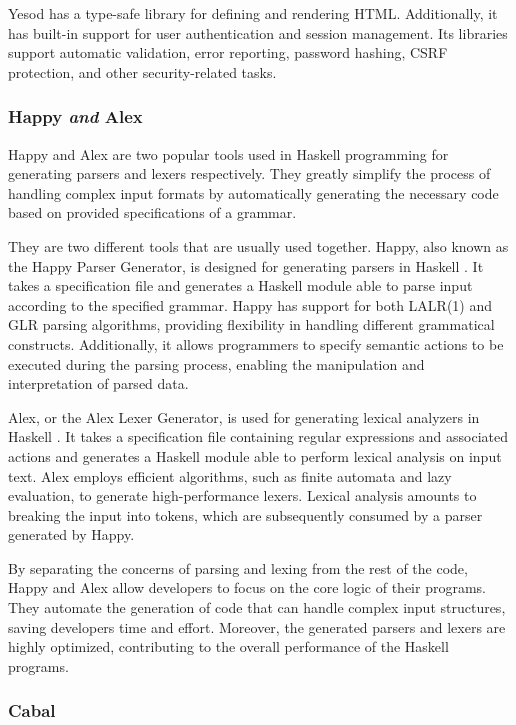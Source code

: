 \documentclass[a4paper, titlepage, twoside]{article}
\begin{document}
Yesod has a type-safe library for defining and rendering HTML. Additionally, it has built-in support for user authentication and session management. Its libraries support automatic validation, error reporting, password hashing, CSRF protection, and other security-related tasks.

\subsubsection{Happy \emph{and} Alex}
\label{sec:orgb5a51e8}

Happy and Alex are two popular tools used in Haskell programming for generating parsers and lexers respectively. They greatly simplify the process of handling complex input formats by automatically generating the necessary code based on provided specifications of a grammar.

They are two different tools that are usually used together. Happy, also known as the Happy Parser Generator, is designed for generating parsers in Haskell \autocite{Happy2023}. It takes a specification file and generates a Haskell module able to parse input according to the specified grammar. Happy has support for both LALR(1) and GLR parsing algorithms, providing flexibility in handling different grammatical constructs. Additionally, it allows programmers to specify semantic actions to be executed during the parsing process, enabling the manipulation and interpretation of parsed data.

Alex, or the Alex Lexer Generator, is used for generating lexical analyzers in Haskell \autocite{AlexLexicalAnalyser2023}. It takes a specification file containing regular expressions and associated actions and generates a Haskell module able to perform lexical analysis on input text. Alex employs efficient algorithms, such as finite automata and lazy evaluation, to generate high-performance lexers. Lexical analysis amounts to breaking the input into tokens, which are subsequently consumed by a parser generated by Happy.

By separating the concerns of parsing and lexing from the rest of the code, Happy and Alex allow developers to focus on the core logic of their programs. They automate the generation of code that can handle complex input structures, saving developers time and effort. Moreover, the generated parsers and lexers are highly optimized, contributing to the overall performance of the Haskell programs.

\subsubsection{Cabal}
\label{sec:org1929684}
\end{document}
